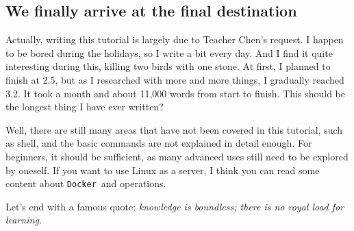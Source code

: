 \documentclass[12pt]{ctexart}
\begin{document}
\subsection*{\textbf{We finally arrive at the final destination}}

Actually, writing this tutorial is largely due to Teacher
Chen's request. I happen to be bored during the
holidays, so I write a bit every day. And I find it quite interesting
during this, killing two birds with one stone. At first, I planned to
finish at 2.5, but as I researched with more and more things, I
gradually reached 3.2. It took a month and about 11,000 words from start
to finish. This should be the longest thing I have ever written?


Well, there are still many areas that have not been covered in this
tutorial, such as shell, and the basic commands are not explained in
detail enough. For beginners, it should be sufficient, as many advanced
uses still need to be explored by oneself. If you want to use Linux as a
server, I think you can read some content about \texttt{Docker}\ and
operations.

Let's end with a famous quote: \emph{knowledge is
boundless; there is no royal load for learning.}
\end{document}
